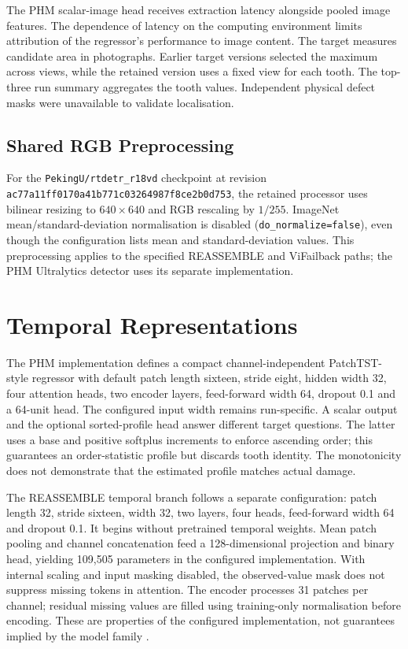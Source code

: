 The PHM scalar-image head receives extraction latency alongside pooled image features.
The dependence of latency on the computing environment limits attribution of the
regressor's performance to image content. The target measures candidate area in
photographs. Earlier target versions selected the maximum across views, while the
retained version uses a fixed view for each tooth. The top-three run summary aggregates
the tooth values. Independent physical defect masks were unavailable to validate
localisation.

\subsection{Shared RGB Preprocessing}
\label{sec:rtdetr-preprocessing}
For the \texttt{PekingU/rtdetr\_r18vd} checkpoint at revision
\nolinkurl{ac77a11ff0170a41b771c03264987f8ce2b0d753}, the retained processor uses
bilinear resizing to $640\times640$ and RGB rescaling by $1/255$.
ImageNet mean/standard-deviation normalisation is disabled
(\texttt{do\_normalize=false}), even though the configuration lists mean and standard-deviation
values. This preprocessing applies to the specified REASSEMBLE and ViFailback
paths; the PHM Ultralytics detector uses its separate implementation.

\section{Temporal Representations}
The PHM implementation defines a compact channel-independent PatchTST-style regressor
with default patch length sixteen, stride eight, hidden width 32, four attention heads,
two encoder layers, feed-forward width 64, dropout 0.1 and a 64-unit head. The
configured input width remains run-specific. A scalar output and the optional
sorted-profile head answer different target questions. The latter uses a base and
positive softplus increments to enforce ascending order; this guarantees an
order-statistic profile but discards tooth identity. The monotonicity does not
demonstrate that the estimated profile matches actual damage.

The REASSEMBLE temporal branch follows a separate configuration: patch length 32, stride
sixteen, width 32, two layers, four heads, feed-forward width 64 and dropout 0.1. It
begins without pretrained temporal weights. Mean patch pooling and channel concatenation
feed a 128-dimensional projection and binary head, yielding 109,505 parameters in the
configured implementation. With internal scaling and input masking disabled, the observed-value mask does not
suppress missing tokens in attention. The encoder processes 31 patches per channel;
residual missing values are filled using training-only normalisation before encoding.
These are properties of the configured implementation, not guarantees implied by the
model family \parencite{Nie2023PatchTST}.

